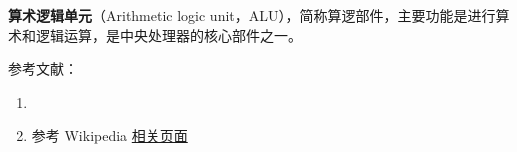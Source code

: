 
\begin{issues}
\issueDraft
\end{issues}

\textbf{算术逻辑单元}（Arithmetic logic unit，ALU），简称算逻部件，主要功能是进行算术和逻辑运算，是中央处理器的核心部件之一。

参考文献：
\begin{enumerate}
\item \cite{唐计}
\item 参考 Wikipedia \href{https://en.wikipedia.org/wiki/Arithmetic_logic_unit}{相关页面}
\end{enumerate}
